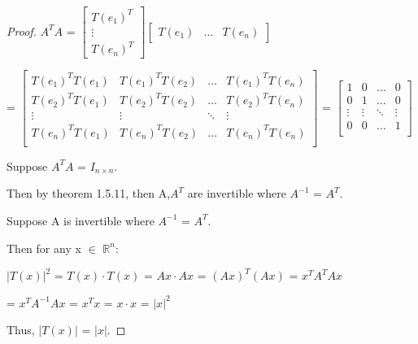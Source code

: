 \begin{proof}
        \hspace{0.5cm}
        $A^TA$ =
        $\begin{bmatrix}
            T(e_1)^T \\
            \vdots \\
            T(e_n)^T 
        \end{bmatrix}
        \begin{bmatrix}
            T(e_1) & ... & T(e_n)
        \end{bmatrix}$
        
        \hspace{1.5cm}
        =
        $\begin{bmatrix}
            T(e_1)^T T(e_1) & T(e_1)^T T(e_2) & \hdots & T(e_1)^T T(e_n) \\
            T(e_2)^T T(e_1) & T(e_2)^T T(e_2) & \hdots & T(e_2)^T T(e_n) \\
            \vdots & \vdots & \ddots & \vdots \\
            T(e_n)^T T(e_1) & T(e_n)^T T(e_2) & \hdots & T(e_n)^T T(e_n) \\
        \end{bmatrix}$ =
        $\begin{bmatrix}
            1 & 0 & \hdots & 0 \\
            0 & 1 & \hdots & 0 \\
            \vdots & \vdots & \ddots & \vdots \\
            0 & 0 & \hdots & 1 \\
        \end{bmatrix}$

        \vspace{0.3cm}

        Suppose $A^TA$ = $I_{n \times n}$.

        Then by {\color{red} theorem 1.5.11}, then A,$A^T$ are invertible
        where $A^{-1}$ = $A^T$.

        \vspace{0.5cm}

        Suppose A is invertible where $A^{-1}$ = $A^T$.
        
        Then for any x $\in$ $\mathbb{R}^n$:

        \hspace{0.5cm}
        $|T(x)|^2$
        = $T(x) \cdot T(x)$
        = $Ax \cdot Ax$
        = $(Ax)^T(Ax)$
        = $x^TA^TAx$

        \hspace{1.9cm}
        = $x^TA^{-1}Ax$
        = $x^Tx$
        = $x \cdot x$
        = $|x|^2$

        Thus, $|T(x)|$ = $|x|$.
    \end{proof}


